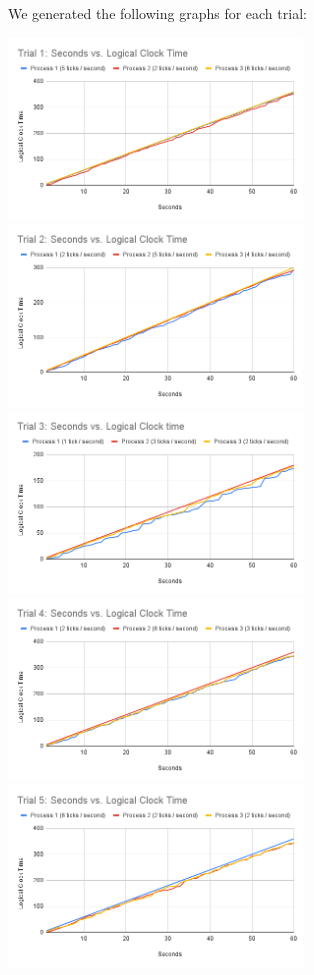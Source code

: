\documentclass[
	a4paper, %
	10pt, %
	unnumberedsections, %
	twoside, %
]{LTJournalArticle}
\begin{document}
We generated the following graphs for each trial: 

\includegraphics[width=7.8cm]{assets/t1_clock.png}
\includegraphics[width=7.8cm]{assets/t2_clock.png}
\includegraphics[width=7.8cm]{assets/t3_clock.png}
\includegraphics[width=7.8cm]{assets/t4_clock.png}
\includegraphics[width=7.8cm]{assets/t5_clock.png}
\end{document}
